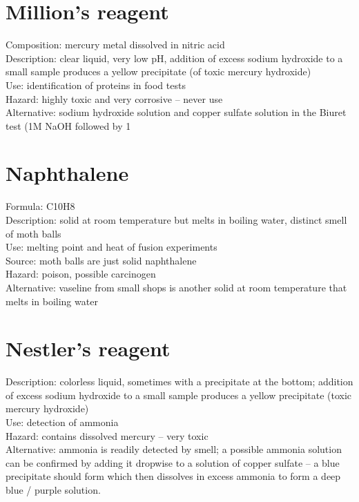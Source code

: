 \section{Million's reagent}
Composition: mercury metal dissolved in nitric acid\\
Description: clear liquid, 
very low pH, 
addition of excess sodium hydroxide to a small sample 
produces a yellow precipitate (of toxic mercury hydroxide)\\
Use: identification of proteins in food tests\\
Hazard: highly toxic and very corrosive – never use\\
Alternative: sodium hydroxide solution 
and copper sulfate solution in the Biuret test 
(1M NaOH followed by 1%

\section{Naphthalene}
Formula: C10H8\\
Description: solid at room temperature but melts in boiling water, 
distinct smell of moth balls\\
Use: melting point and heat of fusion experiments\\
Source: moth balls are just solid naphthalene\\
Hazard: poison, 
possible carcinogen\\
Alternative: vaseline from small shops is 
another solid at room temperature that melts in boiling water

\section{Nestler's reagent}
Description: colorless liquid, 
sometimes with a precipitate at the bottom; 
addition of excess sodium hydroxide to a small sample 
produces a yellow precipitate (toxic mercury hydroxide)\\
Use: detection of ammonia\\
Hazard: contains dissolved mercury – very toxic\\
Alternative: ammonia is readily detected by smell; 
a possible ammonia solution can be confirmed by adding it dropwise 
to a solution of copper sulfate – 
a blue precipitate should form 
which then dissolves in excess ammonia to form a deep blue / purple solution.

